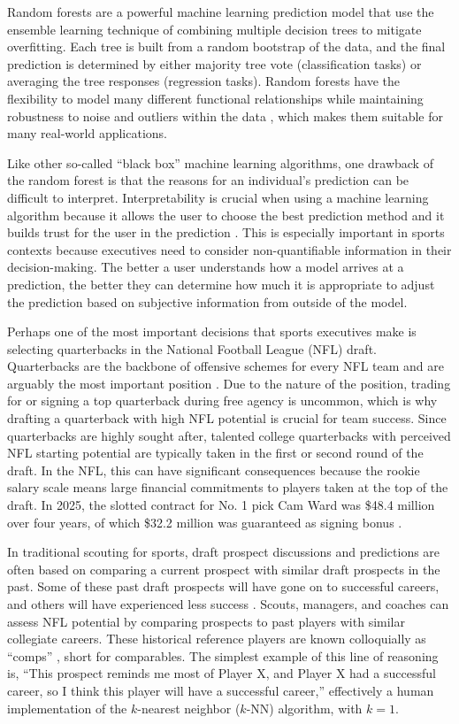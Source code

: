 \documentclass[Review, sageh, times]{sagej}
\begin{document}
Random forests are a powerful machine learning prediction model that use the ensemble learning technique of combining multiple decision trees to mitigate overfitting. Each tree is built from a random bootstrap of the data, and the final prediction is determined by either majority tree vote (classification tasks) or averaging the tree responses (regression tasks). Random forests have the flexibility to model many different functional relationships while maintaining robustness to noise and outliers within the data \citep{breiman_random_2001}, which makes them suitable for many real-world applications.

Like other so-called ``black box'' machine learning algorithms, one drawback of the random forest is that the reasons for an individual's prediction can be difficult to interpret. Interpretability is crucial when using a machine learning algorithm because it allows the user to choose the best prediction method and it builds trust for the user in the prediction \citep{ribeiro_why_2016}. This is especially important in sports contexts because executives need to consider non-quantifiable information in their decision-making. The better a user understands how a model arrives at a prediction, the better they can determine how much it is appropriate to adjust the prediction based on subjective information from outside of the model.

Perhaps one of the most important decisions that sports executives make is selecting quarterbacks in the National Football League (NFL) draft. Quarterbacks are the backbone of offensive schemes for every NFL team and are arguably the most important position \citep{hughes_positional_2015}. Due to the nature of the position, trading for or signing a top quarterback during free agency is uncommon, which is why drafting a quarterback with high NFL potential is crucial for team success. Since quarterbacks are highly sought after, talented college quarterbacks with perceived NFL starting potential are typically taken in the first or second round of the draft. In the NFL, this can have significant consequences because the rookie salary scale means large financial commitments to players taken at the top of the draft. In 2025, the slotted contract for No. 1 pick Cam Ward was \$48.4 million over four years, of which \$32.2 million was guaranteed as signing bonus \citep{badenhausen_nfl_2025}.

In traditional scouting for sports, draft prospect discussions and predictions are often based on comparing a current prospect with similar draft prospects in the past. Some of these past draft prospects will have gone on to successful careers, and others will have experienced less success \citep{trapasso_nfl_2025}. Scouts, managers, and coaches can assess NFL potential by comparing prospects to past players with similar collegiate careers. These historical reference players are known colloquially as ``comps'' \citep{jones_nfl_2025}, short for comparables. The simplest example of this line of reasoning is, ``This prospect reminds me most of Player X, and Player X had a successful career, so I think this player will have a successful career,'' effectively a human implementation of the $k$-nearest neighbor ($k$-NN) algorithm, with $k = 1$.
\end{document}
